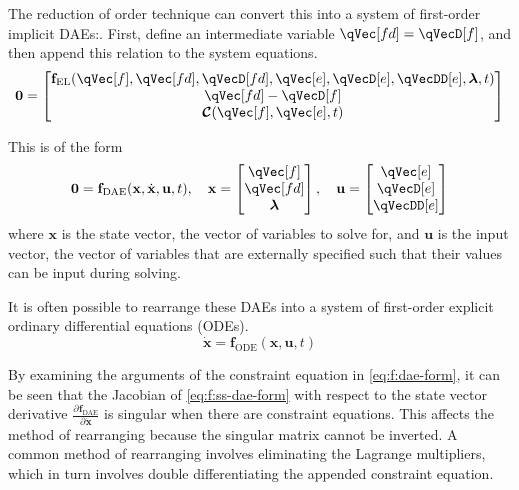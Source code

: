 \documentclass[11pt]{article}
\newcommand{\pD}[2]{
    \frac{\partial\mspace{1mu}#1}{\partial\mspace{1mu}#2}
}
\begin{document}
The reduction of order technique can convert this into a system of first-order implicit DAEs:. First, define an intermediate variable $\qVec[fd]=\qVecD[f]$, and then append this relation to the system equations.
\begin{equation} \label{eq:f:dae-form}
    \mathbf{0} = \begin{bmatrix} \mathbf{f}_{\mathrm{EL}}(\qVec[f], \qVec[fd], \qVecD[fd], \qVec[e], \qVecD[e], \qVecDD[e], \bm{\lambda}, t) \\ \qVec[fd] - \qVecD[f] \\ \bm{\mathcal{C}}(\qVec[f], \qVec[e], t) \end{bmatrix}
\end{equation}

This is of the form
\begin{equation} \label{eq:f:ss-dae-form}
    \mathbf{0} = \mathbf{f}_{\mathrm{DAE}}(\mathbf{x},\dot{\mathbf{x}},\mathbf{u},t)
    ,\quad
    \mathbf{x} = \begin{bmatrix} \qVec[f] \\  \qVec[fd] \\ \bm{\lambda} \end{bmatrix}
    ,\quad
    \mathbf{u} = \begin{bmatrix} \qVec[e] \\  \qVecD[e] \\  \qVecDD[e] \end{bmatrix}
\end{equation}
where $\mathbf{x}$ is the state vector, the vector of variables to solve for, and $\mathbf{u}$ is the input vector, the vector of variables that are externally specified such that their values can be input during solving.

It is often possible \cite{RF1-13} to rearrange these DAEs into a system of first-order explicit ordinary differential equations (ODEs).
\begin{equation} \label{eq:f:ss-explicit-form}
    \dot{\mathbf{x}} = \mathbf{f}_{\mathrm{ODE}}(\mathbf{x}, \mathbf{u}, t)
\end{equation}

By examining the arguments of the constraint equation in \eqref{eq:f:dae-form}, it can be seen that the Jacobian of \eqref{eq:f:ss-dae-form} with respect to the state vector derivative $\pD{\mathbf{f}_{\mathrm{DAE}}}{\dot{\mathbf{x}}}$ is singular when there are constraint equations. This affects the method of rearranging because the singular matrix cannot be inverted. A common method of rearranging involves eliminating the Lagrange multipliers, which in turn involves double differentiating the appended constraint equation.
\end{document}
